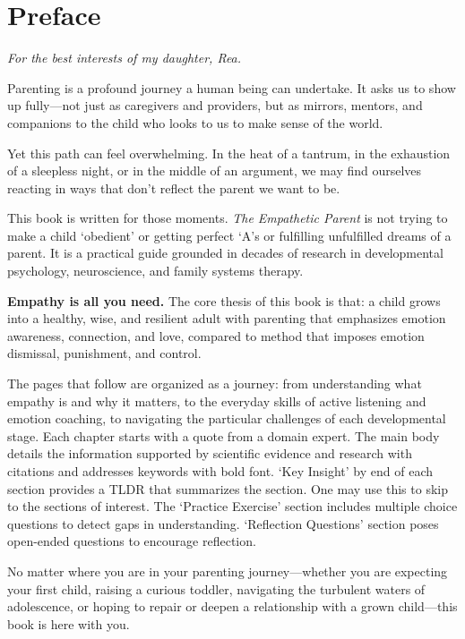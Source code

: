 \chapter*{Preface}
\textit{For the best interests of my daughter, Rea.}

\newpage

Parenting is a profound journey a human being can undertake. 
It asks us to show up fully---not just as caregivers and providers, but as mirrors, mentors, and companions to the child who looks to us to make sense of the world.

Yet this path can feel overwhelming. 
In the heat of a tantrum, in the exhaustion of  a sleepless night, or in the middle of an argument, we may find ourselves reacting in ways that don't reflect the parent we want to be.

This book is written for those moments.
\textit{The Empathetic Parent} is not trying to make a child `obedient' or getting perfect `A's or fulfilling unfulfilled dreams of a parent. 
It is a practical guide grounded in decades of research in developmental psychology, neuroscience, and family systems therapy. 

\textbf{Empathy is all you need.} 
The core thesis of this book is that: a child grows into a healthy, wise, and resilient adult with parenting that emphasizes emotion awareness, connection, and love, compared to method that imposes emotion dismissal, punishment, and control.

The pages that follow are organized as a journey: from understanding what empathy is and why it matters, to the everyday skills of active listening and emotion coaching, to navigating the particular challenges of each developmental stage.
Each chapter starts with a quote from a domain expert.
The main body details the information supported by scientific evidence and research with citations and addresses keywords with bold font.
`Key Insight' by end of each section provides a TLDR that summarizes the section.
One may use this to skip to the sections of interest.
The `Practice Exercise' section includes multiple choice questions to detect gaps in understanding.
`Reflection Questions' section poses open-ended questions to encourage reflection.
 
No matter where you are in your parenting journey---whether you are expecting your first child, raising a curious toddler, navigating the turbulent waters of adolescence, or hoping to repair or deepen a relationship with a grown child---this book is here with you.

